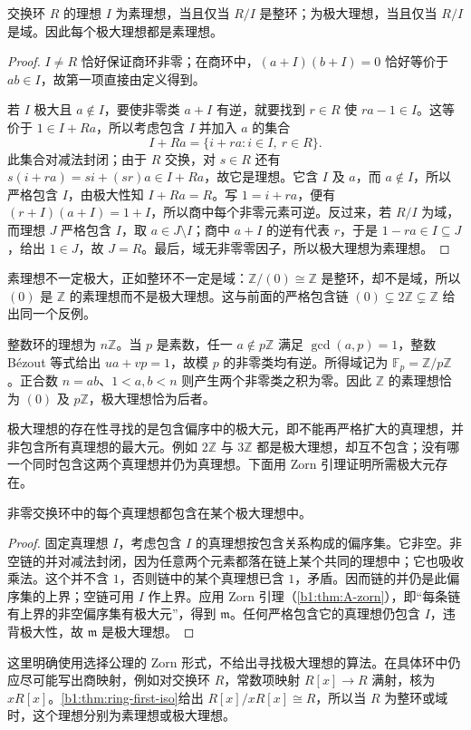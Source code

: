 \begin{proposition}\label{b1:prop:prime-max-quotient}
	交换环 \(R\) 的理想 \(I\) 为素理想，当且仅当 \(R/I\) 是整环；为极大理想，当且仅当 \(R/I\) 是域。因此每个极大理想都是素理想。
\end{proposition}
\begin{proof}
	\(I\ne R\) 恰好保证商环非零；在商环中，\((a+I)(b+I)=0\) 恰好等价于 \(ab\in I\)，故第一项直接由定义得到。

	若 \(I\) 极大且 \(a\notin I\)，要使非零类 \(a+I\) 有逆，就要找到 \(r\in R\) 使 \(ra-1\in I\)。这等价于 \(1\in I+Ra\)，所以考虑包含 \(I\) 并加入 \(a\) 的集合
	\[
		I+Ra=\{i+ra:i\in I,\ r\in R\}.
	\]
	此集合对减法封闭；由于 \(R\) 交换，对 \(s\in R\) 还有 \(s(i+ra)=si+(sr)a\in I+Ra\)，故它是理想。它含 \(I\) 及 \(a\)，而 \(a\notin I\)，所以严格包含 \(I\)，由极大性知 \(I+Ra=R\)。写 \(1=i+ra\)，便有 \((r+I)(a+I)=1+I\)，所以商中每个非零元素可逆。反过来，若 \(R/I\) 为域，而理想 \(J\) 严格包含 \(I\)，取 \(a\in J\setminus I\)；商中 \(a+I\) 的逆有代表 \(r\)，于是 \(1-ra\in I\subseteq J\)，给出 \(1\in J\)，故 \(J=R\)。最后，域无非零零因子，所以极大理想为素理想。
\end{proof}
素理想不一定极大，正如整环不一定是域：\(\mathbb Z/(0)\cong\mathbb Z\) 是整环，却不是域，所以 \((0)\) 是 \(\mathbb Z\) 的素理想而不是极大理想。这与前面的严格包含链 \((0)\subsetneq2\mathbb Z\subsetneq\mathbb Z\) 给出同一个反例。

\ProseParagraphBreak
整数环的理想为 \(n\mathbb Z\)。当 \(p\) 是素数，任一 \(a\notin p\mathbb Z\) 满足 \(\gcd(a,p)=1\)，整数 Bézout 等式给出 \(ua+vp=1\)，故模 \(p\) 的非零类均有逆。所得域记为 \(\mathbb F_p=\mathbb Z/p\mathbb Z\)。正合数 \(n=ab\)、\(1<a,b<n\) 则产生两个非零类之积为零。因此 \(\mathbb Z\) 的素理想恰为 \((0)\) 及 \(p\mathbb Z\)，极大理想恰为后者。

\ProseParagraphBreak
极大理想的存在性寻找的是包含偏序中的极大元，即不能再严格扩大的真理想，并非包含所有真理想的最大元。例如 \(2\mathbb Z\) 与 \(3\mathbb Z\) 都是极大理想，却互不包含；没有哪一个同时包含这两个真理想并仍为真理想。下面用 Zorn 引理证明所需极大元存在。

\begin{proposition}\label{b1:prop:maximal-ideal-exists}
	非零交换环中的每个真理想都包含在某个极大理想中。
\end{proposition}
\begin{proof}
	固定真理想 \(I\)，考虑包含 \(I\) 的真理想按包含关系构成的偏序集。它非空。非空链的并对减法封闭，因为任意两个元素都落在链上某个共同的理想中；它也吸收乘法。这个并不含 \(1\)，否则链中的某个真理想已含 \(1\)，矛盾。因而链的并仍是此偏序集的上界；空链可用 \(I\) 作上界。应用 Zorn 引理（\cref{b1:thm:A-zorn}），即“每条链有上界的非空偏序集有极大元”，得到 \(\mathfrak m\)。任何严格包含它的真理想仍包含 \(I\)，违背极大性，故 \(\mathfrak m\) 是极大理想。
\end{proof}
这里明确使用选择公理的 Zorn 形式，不给出寻找极大理想的算法。在具体环中仍应尽可能写出商映射，例如对交换环 \(R\)，常数项映射 \(R[x]\rightarrow R\) 满射，核为 \(xR[x]\)。\cref{b1:thm:ring-first-iso}给出 \(R[x]/xR[x]\cong R\)，所以当 \(R\) 为整环或域时，这个理想分别为素理想或极大理想。
